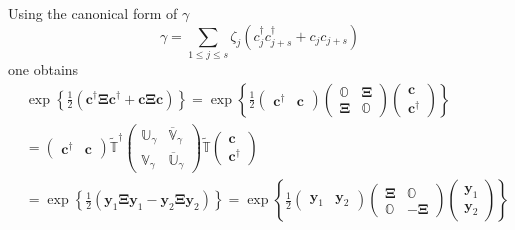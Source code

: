 \documentclass[aps, preprint]{revtex4}
\begin{document}
Using the canonical form of $\gamma $
\begin{equation}\gamma  = \sum _{1 \leq j \leq s}\zeta _{j} \left (c_{j}^{ \dag } c_{j +s}^{ \dag } +c_{j} c_{j +s}\right )
\end{equation}one obtains
\begin{align} & \exp  \left \{\frac{1}{2} \left (\mathbf{c}^{ \dag } \mathbf{\Xi } \mathbf{c}^{ \dag } +\mathbf{c} \mathbf{\Xi } \mathbf{c}\right )\right \} =\exp  \left \{\frac{1}{2} \left (\begin{array}{cc}\mathbf{c}^{ \dag } & \mathbf{c}\end{array}\right ) \left (\begin{array}{cc}\mathbb{O} & \mathbf{\Xi } \\
\mathbf{\Xi } & \mathbb{O}\end{array}\right ) \left (\begin{array}{c}\mathbf{c} \\
\mathbf{c}^{ \dag }\end{array}\right )\right \} \\
 &  =\left (\begin{array}{cc}\mathbf{c}^{ \dag } & \mathbf{c}\end{array}\right ) \widetilde{\mathbb{T}}^{ \dag } \left (\begin{array}{cc}\mathbb{U}_{\gamma } & \overline{\mathbb{V}}_{\gamma } \\
\mathbb{V}_{\gamma } & \overline{\mathbb{U}}_{\gamma }\end{array}\right ) \widetilde{\mathbb{T}} \left (\begin{array}{c}\mathbf{c} \\
\mathbf{c}^{ \dag }\end{array}\right ) \\
 &  =\exp  \left \{\frac{1}{2} \left (\mathbf{y}_{1} \mathbf{\Xi } \mathbf{y}_{1} -\mathbf{y}_{2} \mathbf{\Xi } \mathbf{y}_{2}\right )\right \} =\exp  \left \{\frac{1}{2} \left (\begin{array}{cc}\mathbf{y}_{1} & \mathbf{y}_{2}\end{array}\right ) \left (\begin{array}{cc}\mathbf{\Xi } & \mathbb{O} \\
\mathbb{O} &  -\mathbf{\Xi }\end{array}\right ) \left (\begin{array}{c}\mathbf{y}_{1} \\
\mathbf{y}_{2}\end{array}\right )\right \} \\

\end{align}
\end{document}
